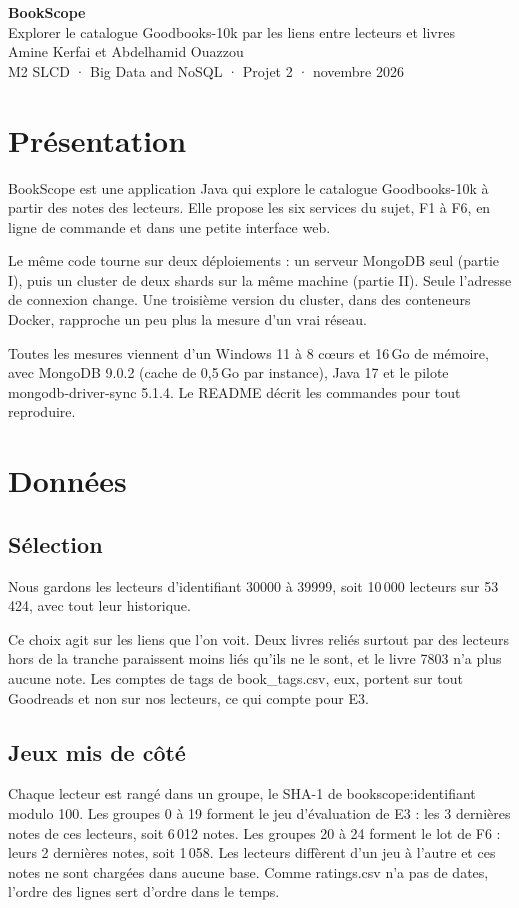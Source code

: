 \documentclass[11pt,a4paper]{article}
\title{}
\author{}
\date{}
\begin{document}
\thispagestyle{plain}
\begin{center}
{\fontsize{26}{30}\selectfont\bfseries BookScope}\\[6pt]
{\large Explorer le catalogue Goodbooks-10k par les liens entre lecteurs et livres}\\[6pt]
Amine Kerfai et Abdelhamid Ouazzou\\[2pt]
{\small M2 SLCD · Big Data and NoSQL · Projet 2 · novembre 2026}
\end{center}
\vspace{4pt}
\section{Présentation}
BookScope est une application Java qui explore le catalogue Goodbooks-10k à partir des notes des lecteurs. Elle propose les six services du sujet, F1 à F6, en ligne de commande et dans une petite interface web.

Le même code tourne sur deux déploiements : un serveur MongoDB seul (partie I), puis un cluster de deux shards sur la même machine (partie II). Seule l'adresse de connexion change. Une troisième version du cluster, dans des conteneurs Docker, rapproche un peu plus la mesure d'un vrai réseau.

Toutes les mesures viennent d'un Windows 11 à 8 cœurs et 16\,Go de mémoire, avec MongoDB 9.0.2 (cache de 0,5\,Go par instance), Java 17 et le pilote mongodb-driver-sync 5.1.4. Le README décrit les commandes pour tout reproduire.

\section{Données}
\subsection{Sélection}
Nous gardons les lecteurs d'identifiant 30000 à 39999, soit 10\,000 lecteurs sur 53\,424, avec tout leur historique.

Ce choix agit sur les liens que l'on voit. Deux livres reliés surtout par des lecteurs hors de la tranche paraissent moins liés qu'ils ne le sont, et le livre 7803 n'a plus aucune note. Les comptes de tags de book\_tags.csv, eux, portent sur tout Goodreads et non sur nos lecteurs, ce qui compte pour E3.

\subsection{Jeux mis de côté}
Chaque lecteur est rangé dans un groupe, le SHA-1 de \og bookscope:identifiant\fg{} modulo 100. Les groupes 0 à 19 forment le jeu d'évaluation de E3 : les 3 dernières notes de ces lecteurs, soit 6\,012 notes. Les groupes 20 à 24 forment le lot de F6 : leurs 2 dernières notes, soit 1\,058. Les lecteurs diffèrent d'un jeu à l'autre et ces notes ne sont chargées dans aucune base. Comme ratings.csv n'a pas de dates, l'ordre des lignes sert d'ordre dans le temps.
\end{document}
